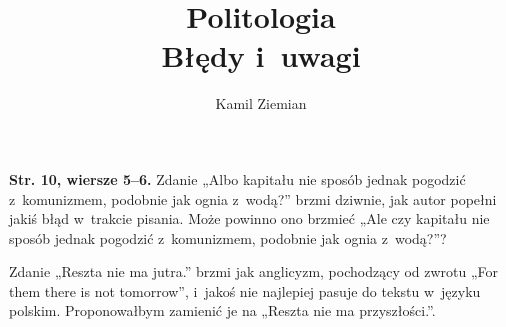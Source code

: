 \documentclass[a4paper,11pt]{article}
\title{Politologia \\
  {\Large Błędy i~uwagi}}
\author{Kamil Ziemian}
\begin{document}





\maketitle  %












\vspace{0em}



\vspace{0em}


\noindent
\textbf{Str. 10, wiersze 5--6.} Zdanie „Albo kapitału nie sposób jednak
pogodzić z~komunizmem, podobnie jak ognia z~wodą?” brzmi dziwnie,
jak autor popełni jakiś błąd w~trakcie pisania. Może powinno ono brzmieć
„Ale czy kapitału nie sposób jednak pogodzić z~komunizmem, podobnie jak
ognia z~wodą?”?

\vspace{\spaceFour}





\noindent
{} Zdanie „Reszta nie ma jutra.” brzmi jak anglicyzm,
pochodzący od zwrotu „For them there is not tomorrow”, i~jakoś nie
najlepiej pasuje do tekstu w~języku polskim. Proponowałbym zamienić je na
„Reszta nie ma przyszłości.”.

\vspace{\spaceFour}
\end{document}
